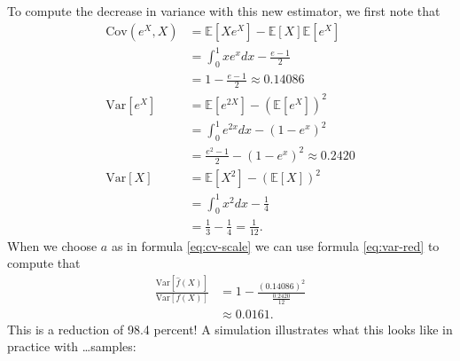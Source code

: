 To compute the decrease in variance with this new estimator, we first note that
\begin{align*}
    \text{Cov}(e^X, X) &= \mathbb{E}[ Xe^X ] - \mathbb{E}[ X ]\mathbb{E}[ e^X ] \\
        &= \int_0^1 xe^x dx - \frac{e-1}{2} \\
        &= 1 - \frac{e-1}{2} \approx 0.14086 \\
    \text{Var}[e^X] &= \mathbb{E}[e^{2X}] - (\mathbb{E}[e^X])^2 \\
        &= \int_0^1 e^{2x} dx - (1 - e^x)^2 \\
        &= \frac{e^2 - 1}{2}  - (1 - e^x)^2 \approx 0.2420 \\
    \text{Var}[X] &= \mathbb{E}[X^2] - (\mathbb{E}[X])^2 \\
        &= \int_0^1 x^2 dx - \frac{1}{4} \\
        &= \frac{1}{3} - \frac{1}{4} = \frac{1}{12}.
\end{align*}
When we choose $a$ as in formula \ref{eq:cv-scale} we can use formula \ref{eq:var-red} to compute that
\begin{align}
    \frac{\text{Var}[ \hat{f}(X) ]}{\text{Var}[ f(X) ]} &= 1 - \frac{(0.14086)^2}{\frac{0.2420}{12}} \\
        &\approx 0.0161.
\end{align}
This is a reduction of 98.4 percent! A simulation illustrates what this looks like in practice with \dots samples:
